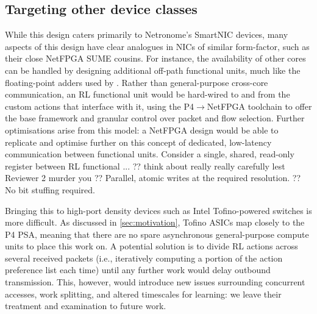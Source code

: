 \documentclass[sigconf,natbib=false]{acmart}
\begin{document}
\subsection{Targeting other device classes}
While this design caters primarily to Netronome's SmartNIC devices, many aspects of this design have clear analogues in NICs of similar form-factor, such as their close NetFPGA SUME cousins.
For instance, the availability of other cores can be handled by designing additional off-path functional units, much like the floating-point adders used by \textcite{DBLP:conf/isca/LiLYCSH19}.
Rather than general-purpose cross-core communication, an RL functional unit would be hard-wired to and from the custom actions that interface with it, using the P4$\rightarrow$NetFPGA toolchain to offer the base framework and granular control over packet and flow selection.
Further optimisations arise from this model: a NetFPGA design would be able to replicate and optimise further on this concept of dedicated, low-latency communication between functional units.
Consider a single, shared, read-only register between RL functional ...
?? think about really really carefully lest Reviewer 2 murder you
?? Parallel, atomic writes at the required resolution.
?? No bit stuffing required.

Bringing this to high-port density devices such as Intel Tofino-powered switches is more difficult.
As discussed in \cref{sec:motivation}, Tofino ASICs map closely to the P4 PSA, meaning that there are no spare asynchronous general-purpose compute units to place this work on.
A potential solution is to divide RL actions across several received packets (i.e., iteratively computing a portion of the action preference list each time) until any further work would delay outbound transmission.
This, however, would introduce new issues surrounding concurrent accesses, work splitting, and altered timescales for learning: we leave their treatment and examination to future work.
\end{document}
